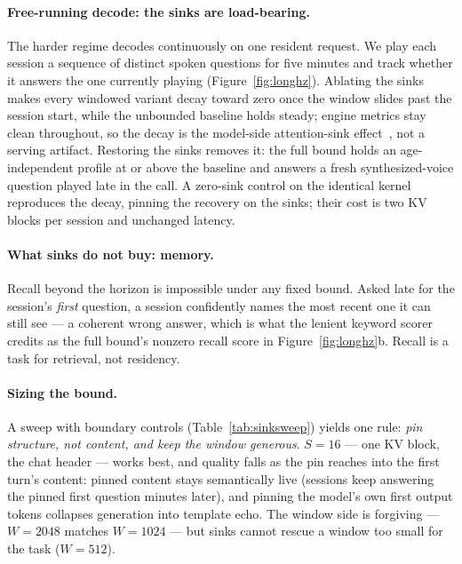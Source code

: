 \paragraph{Free-running decode: the sinks are load-bearing.} The harder regime decodes continuously
on one resident request. We play each session a sequence of distinct spoken questions for five
minutes and track whether it answers the one currently playing (Figure~\ref{fig:longhz}). Ablating
the sinks makes every windowed variant decay toward zero once the window slides past the session
start, while the unbounded baseline holds steady; engine metrics stay clean throughout, so the decay
is the model-side attention-sink effect~\citep{streamingllm}, not a serving artifact. Restoring the
sinks removes it: the full bound holds an age-independent profile at or above the baseline and
answers a fresh synthesized-voice question played late in the call. A zero-sink control on the
identical kernel reproduces the decay, pinning the recovery on the sinks; their cost is two KV blocks
per session and unchanged latency.

\paragraph{What sinks do not buy: memory.} Recall beyond the horizon is impossible under any fixed
bound. Asked late for the session's \emph{first} question, a session confidently names the most
recent one it can still see --- a coherent wrong answer, which is what the lenient keyword scorer
credits as the full bound's nonzero recall score in Figure~\ref{fig:longhz}b. Recall is a task for
retrieval, not residency.

\paragraph{Sizing the bound.} A sweep with boundary controls (Table~\ref{tab:sinksweep}) yields one
rule: \emph{pin structure, not content, and keep the window generous}. $S{=}16$ --- one KV block, the
chat header --- works best, and quality falls as the pin reaches into the first turn's content:
pinned content stays semantically live (sessions keep answering the pinned first question minutes
later), and pinning the model's own first output tokens collapses generation into template echo. The
window side is forgiving --- $W{=}2048$ matches $W{=}1024$ --- but sinks cannot rescue a window too
small for the task ($W{=}512$).

